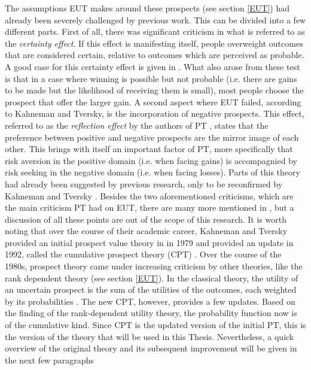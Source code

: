 The assumptions EUT makes around these prospects (see section \ref{EUT}) had already been severely challenged by previous work. This can be divided into a few different parts. First of all, there was significant criticism in what is referred to as the \textit{certainty effect}. If this effect is manifesting itself, people overweight outcomes that are considered certain, relative to outcomes which are perceived as probable. A good case for this certainty effect is given in \cite{Allais}. What also arose from these test is that in a case where winning is possible but not probable (i.e. there are gains to be made but the likelihood of receiving them is small), most people choose the prospect that offer the larger gain. A second aspect where EUT failed, according to Kahneman and Tversky, is the incorporation of negative prospects. This effect, referred to as the \textit{reflection effect} by the authors of PT \cite{prospect1}, states that the preference between positive and negative prospects are the mirror image of each other. This brings with itself an important factor of PT, more specifically that risk aversion in the positive domain (i.e. when facing gains) is accompagnied by risk seeking in the negative domain (i.e. when facing losses). Parts of this theory had already been suggested by previous research, only to be reconfirmed by Kahneman and Tversky \cite{Marko} \cite{Williams}. Besides the two aforementioned criticisms, which are the main criticism PT had on EUT, there are many more mentioned in \cite{prospect1}, but a discussion of all these points are out of the scope of this research. It is worth noting that over the course of their academic career, Kahneman and Tversky provided an initial prospect value theory in \cite{prospect1} in 1979 and provided an update in 1992, called the cumulative prospect theory (CPT) \cite{prospect2}. Over the course of the 1980s, prospect theory came under increasing criticism by other theories, like the rank dependent theory (see section \ref{EUT}). In the classical theory, the utility of an uncertain prospect is the sum of the utilities of the outcomes, each weighted by its probabilities \cite{prospect1}. The new CPT, however, provides a few updates. Based on the finding of the rank-dependent utility theory, the probability function now is of the cumulative kind. Since CPT is the updated version of the initial PT, this is the version of the theory that will be used in this Thesis. Nevertheless, a quick overview of the original theory and its subsequent improvement will be given in the next few paragraphs
\newline \newline \noindent
